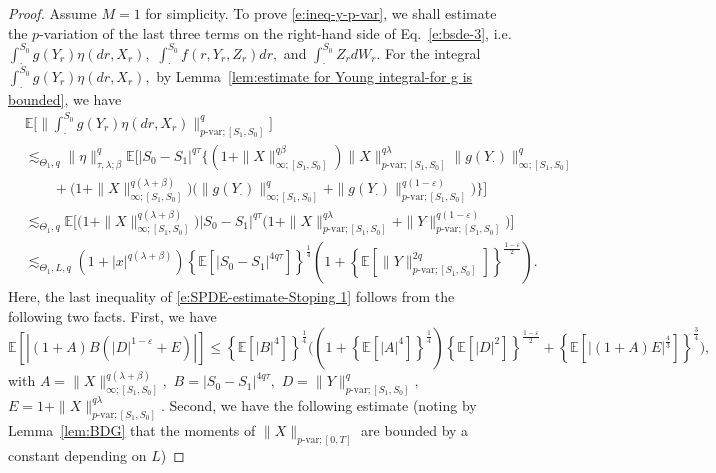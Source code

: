 \documentclass[11pt,reqno]{amsart}
\def\E{\mathbb E}
\numberwithin{equation}{section}
\begin{document}
\begin{proof} 
Assume $M=1$ for simplicity. To prove \eqref{e:ineq-y-p-var}, we shall estimate the $p$-variation of the last three terms on the right-hand side of Eq.~\eqref{e:bsde-3}, i.e. $\int_\cdot^{S_0} g(Y_r)\eta(dr, X_r),$ $\int_{\cdot}^{S_{0}}f(r,Y_{r},Z_{r})dr,$ and $\int_\cdot^{S_0} Z_r dW_r$. For the integral $\int_{\cdot}^{S_{0}}g(Y_{r})\eta(dr,X_{r}),$ by Lemma~\ref{lem:estimate for Young integral-for g is bounded}, we have  
\begin{equation}\label{e:SPDE-estimate-Stoping 1}
\begin{aligned}
&\mathbb{E}\bigg[\Big\|\int_{\cdot}^{S_0}g(Y_{r})\eta(dr,X_{r})\Big\|^{q}_{p\text{-var};[S_{1},S_{0}]}\bigg]\\
&\lesssim_{\Theta_{1},q} \|\eta\|^{q}_{\tau,\lambda;\beta}\mathbb{E}\bigg[|S_{0} - S_{1}|^{q\tau}\Big\{\left(1 + \|X\|^{q\beta}_{\infty;[S_{1},S_{0}]}\right)\|X\|^{q\lambda}_{p\text{-var};[S_{1},S_{0}]}\|g(Y_{\cdot})\|^{q}_{\infty;[S_{1},S_{0}]}\\
&\qquad  
+\Big(1 + \|X\|^{q(\lambda + \beta)}_{\infty;[S_{1},S_{0}]}\Big)\Big(\|g(Y_{\cdot})\|^{q}_{\infty;[S_{1},S_{0}]} + \|g(Y_{\cdot})\|^{q(1-\varepsilon)}_{p\text{-var};[S_{1},S_{0}]}\Big) \Big\}\bigg]\\
&\lesssim_{\Theta_{1},q}\mathbb{E}\bigg[\Big(1 + \|X\|^{q(\lambda + \beta)}_{\infty;[S_{1},S_{0}]}\Big)|S_{0} - S_{1}|^{q\tau}\Big(1 + \|X\|^{q\lambda}_{p\text{-var};[S_{1},S_{0}]} + \|Y\|^{q(1-\varepsilon)}_{p\text{-var};[S_{1},S_{0}]}\Big)\bigg]\\
&\lesssim_{\Theta_{1},L,q} (1 + |x|^{q(\lambda+\beta)})\left\{\mathbb{E}\left[ |S_{0} - S_{1}|^{4q\tau}\right]\right\}^{\frac{1}{4}}\left(1 + \left\{\mathbb{E}\left[\|Y\|^{2q}_{p\text{-var};[S_{1},S_{0}]}\right]\right\}^{\frac{1-\varepsilon}{2}}\right).
\end{aligned}
\end{equation}
Here, the last inequality of \eqref{e:SPDE-estimate-Stoping 1} follows from the following two facts. First, we have
\[\E\left[|(1+A)B(|D|^{1-\varepsilon}+E)|\right]\le \left\{\E[|B|^{4}]\right\}^{\frac{1}{4}} \Big( \left(1 + \left\{\E[|A|^{4}]\right\}^{\frac{1}{4}}\right) \left\{\E[|D|^{2}]\right\}^{\frac{1-\varepsilon}{2}} + \left\{\E[|(1+A)E|^{\frac{4}{3}}]\right\}^{\frac{3}{4}}\Big),\]
with $A = \|X\|^{q(\lambda + \beta)}_{\infty;[S_{1},S_{0}]},$ $B = |S_{0} - S_{1}|^{4q\tau},$ $D = \|Y\|^{q}_{p\text{-var};[S_{1},S_{0}]},$ $E = 1 + \|X\|^{q\lambda}_{p\text{-var};[S_{1},S_{0}]}$. Second, we have the following estimate (noting by Lemma~\ref{lem:BDG} that the moments of $\|X\|_{p\text{-var};[0,T]}$ are bounded by a constant depending on $L$)

\end{proof}
\end{document}
